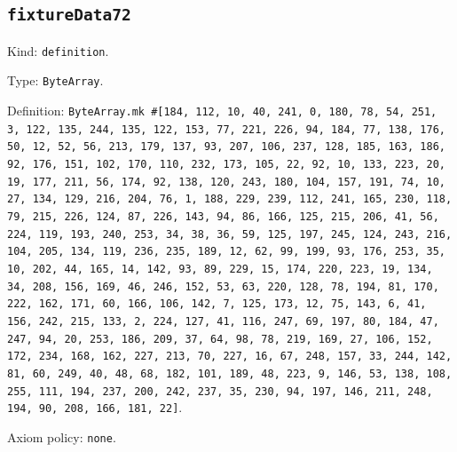 \documentclass[11pt]{article}
\begin{document}
\subsection*{\texttt{fixtureData72}}
\noindent Kind: \texttt{definition}.\par
\noindent Type: \texttt{ByteArray}.\par
\noindent Definition: \texttt{ByteArray.mk \#[184, 112, 10, 40, 241, 0, 180, 78, 54, 251, 3, 122, 135, 244, 135, 122, 153, 77, 221, 226, 94, 184, 77, 138, 176, 50, 12, 52, 56, 213, 179, 137, 93, 207, 106, 237, 128, 185, 163, 186, 92, 176, 151, 102, 170, 110, 232, 173, 105, 22, 92, 10, 133, 223, 20, 19, 177, 211, 56, 174, 92, 138, 120, 243, 180, 104, 157, 191, 74, 10, 27, 134, 129, 216, 204, 76, 1, 188, 229, 239, 112, 241, 165, 230, 118, 79, 215, 226, 124, 87, 226, 143, 94, 86, 166, 125, 215, 206, 41, 56, 224, 119, 193, 240, 253, 34, 38, 36, 59, 125, 197, 245, 124, 243, 216, 104, 205, 134, 119, 236, 235, 189, 12, 62, 99, 199, 93, 176, 253, 35, 10, 202, 44, 165, 14, 142, 93, 89, 229, 15, 174, 220, 223, 19, 134, 34, 208, 156, 169, 46, 246, 152, 53, 63, 220, 128, 78, 194, 81, 170, 222, 162, 171, 60, 166, 106, 142, 7, 125, 173, 12, 75, 143, 6, 41, 156, 242, 215, 133, 2, 224, 127, 41, 116, 247, 69, 197, 80, 184, 47, 247, 94, 20, 253, 186, 209, 37, 64, 98, 78, 219, 169, 27, 106, 152, 172, 234, 168, 162, 227, 213, 70, 227, 16, 67, 248, 157, 33, 244, 142, 81, 60, 249, 40, 48, 68, 182, 101, 189, 48, 223, 9, 146, 53, 138, 108, 255, 111, 194, 237, 200, 242, 237, 35, 230, 94, 197, 146, 211, 248, 194, 90, 208, 166, 181, 22]}.\par
\noindent Axiom policy: \texttt{none}.\par
\end{document}

